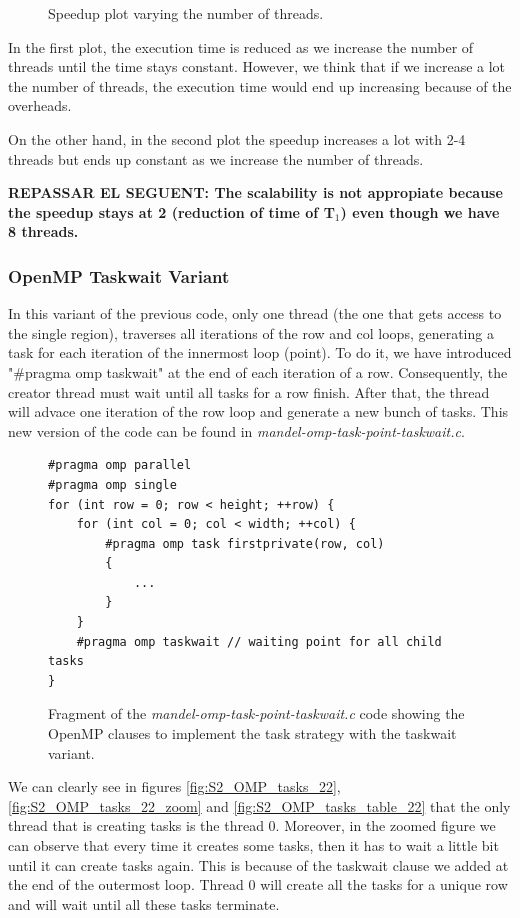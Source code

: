 \documentclass[12pt, a4paper]{article}
\begin{document}
\begin{figure}[H]
\begin{minipage}[b]{0.4\linewidth}
  \caption{Speedup plot varying the number of threads.}
  \label{fig:mandel-omp-10000-strong-21-speedup}
\end{minipage}
\end{figure}

In the first plot, the execution time is reduced as we increase the number of threads until the time stays constant. However, we think that if we increase a lot the number of threads, the execution time would end up increasing because of the overheads.

On the other hand, in the second plot the speedup increases a lot with 2-4 threads but ends up constant as we increase the number of threads.

\textbf{\large{\large{REPASSAR EL SEGUENT: The scalability is not appropiate because the speedup stays at 2 (reduction of time of T$_1$) even though we have 8 threads.}}}

\subsubsection{OpenMP Taskwait Variant}

In this variant of the previous code, only one thread (the one that gets access to the single region), traverses all iterations of the row and col loops, generating a task for each iteration of the innermost loop (point). To do it, we have introduced "\#pragma omp taskwait" at the end of each iteration of a row. Consequently, the creator thread must wait until all tasks for a row finish. After that, the thread will advace one iteration of the row loop and generate a new bunch of tasks. This new version of the code can be found in \textit{mandel-omp-task-point-taskwait.c}.

\begin{figure}[H]
\begin{lstlisting}
#pragma omp parallel
#pragma omp single
for (int row = 0; row < height; ++row) {
	for (int col = 0; col < width; ++col) {
		#pragma omp task firstprivate(row, col)
		{
			...
		}
	}
	#pragma omp taskwait // waiting point for all child tasks
}
\end{lstlisting}
\caption{Fragment of the \textit{mandel-omp-task-point-taskwait.c} code showing the OpenMP clauses to implement the task strategy with the taskwait variant.}
\label{code:task_implementation_point_taskwait}
\end{figure}

We can clearly see in figures \ref{fig:S2_OMP_tasks_22}, \ref{fig:S2_OMP_tasks_22_zoom} and \ref{fig:S2_OMP_tasks_table_22} that the only thread that is creating tasks is the thread 0. Moreover, in the zoomed figure we can observe that every time it creates some tasks, then it has to wait a little bit until it can create tasks again. This is because of the taskwait clause we added at the end of the outermost loop. Thread 0 will create all the tasks for a unique row and will wait until all these tasks terminate.
\end{document}
